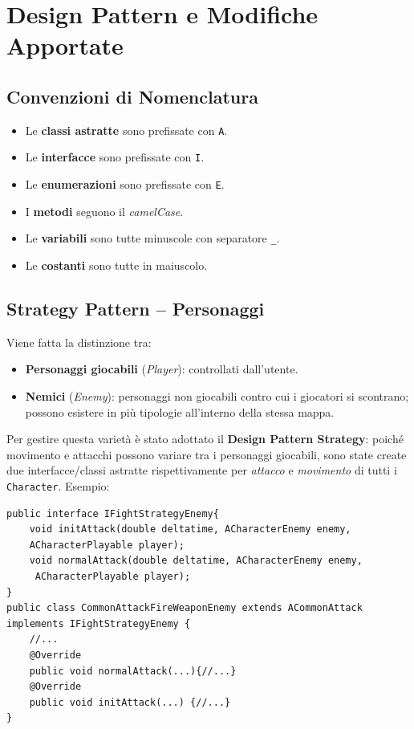 \documentclass[12pt,a4paper]{article}
\begin{document}
\section{Design Pattern e Modifiche Apportate}
\begin{small}
\subsection{Convenzioni di Nomenclatura}

\begin{itemize}
  \item Le \textbf{classi astratte} sono prefissate con \texttt{A}.
  \item Le \textbf{interfacce} sono prefissate con \texttt{I}.
  \item Le \textbf{enumerazioni} sono prefissate con \texttt{E}.
  \item I \textbf{metodi} seguono il \textit{camelCase}.
  \item Le \textbf{variabili} sono tutte minuscole con separatore \texttt{\_}.
  \item Le \textbf{costanti} sono tutte in maiuscolo.
\end{itemize}

\subsection{Strategy Pattern – Personaggi}

Viene fatta la distinzione tra:
\begin{itemize}
  \item \textbf{Personaggi giocabili} (\textit{Player}): controllati dall'utente.
  \item \textbf{Nemici} (\textit{Enemy}): personaggi non giocabili contro cui i giocatori si
    scontrano; possono esistere in più tipologie all'interno della stessa mappa.
\end{itemize}

Per gestire questa varietà è stato adottato il \textbf{Design Pattern Strategy}: poiché movimento
e attacchi possono variare tra i personaggi giocabili, sono state create due interfacce/classi
astratte rispettivamente per \textit{attacco} e \textit{movimento} di tutti i \texttt{Character}.
Esempio:
\begin{verbatim}
public interface IFightStrategyEnemy{
    void initAttack(double deltatime, ACharacterEnemy enemy, 
    ACharacterPlayable player);
    void normalAttack(double deltatime, ACharacterEnemy enemy,
     ACharacterPlayable player);
}
public class CommonAttackFireWeaponEnemy extends ACommonAttack 
implements IFightStrategyEnemy {
    //...
    @Override
    public void normalAttack(...){//...}
    @Override
    public void initAttack(...) {//...}
}
\end{verbatim}


\end{small}
\end{document}
